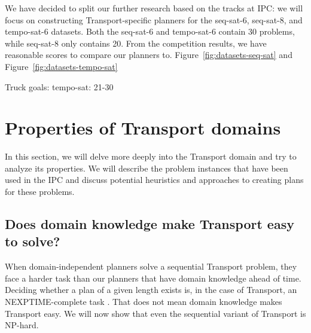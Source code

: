 We have decided to split our further research based on the tracks at IPC: we will focus on constructing
Transport-specific planners for the seq-sat-6, seq-sat-8, and tempo-sat-6 datasets.
Both the seq-sat-6 and tempo-sat-6 contain 30 problems, while seq-sat-8 only contains 20.
From the competition results, we have reasonable scores to compare our planners to.
Figure~\ref{fig:datasets-seq-sat} and Figure~\ref{fig:datasets-tempo-sat}


Truck goals: tempo-sat: 21-30




















\section{Properties of Transport domains}

In this section, we will delve more deeply into the Transport domain and try to analyze its properties.
We will describe the problem instances that have been used in the IPC and discuss potential
heuristics and approaches to creating plans for these problems.



\subsection{Does domain knowledge make Transport easy to solve?}

When domain-independent planners solve a sequential Transport problem,
they face a harder task than our planners that have domain knowledge ahead of time.
Deciding whether a plan of a given length exists is, in the case of Transport,
an NEXPTIME-complete task \citep[Section~3.4]{Ghallab2004}.
That does not mean domain knowledge makes Transport easy. We will now show
that even the sequential variant of Transport is NP-hard.

